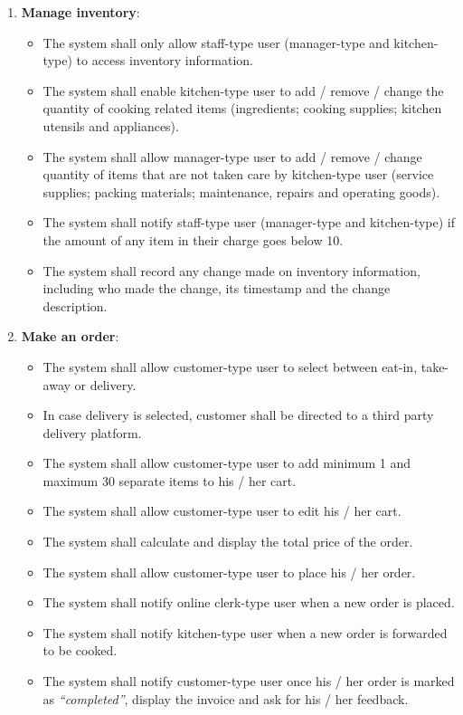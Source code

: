 \documentclass[12pt, a4paper]{article}
\theoremstyle{styleth}
\theoremstyle{styledef}
\begin{document}
\begin{enumerate}[label=\alph*., font=\itshape]
	\item \textbf{Manage inventory}:
	\begin{itemize}
		\item The system shall only allow staff-type user (manager-type and kitchen-type) to access inventory information.
		\item The system shall enable kitchen-type user to add / remove / change the quantity of cooking related items (ingredients; cooking supplies; kitchen utensils and appliances).
		\item The system shall allow manager-type user to add / remove / change quantity of items that are not taken care by kitchen-type user (service supplies; packing materials; maintenance, repairs and operating goods).
		\item The system shall notify staff-type user (manager-type and kitchen-type) if the amount of any item in their charge goes below 10.
		\item The system shall record any change made on inventory information, including who made the change, its timestamp and the change description.
	\end{itemize}
	
	\item \textbf{Make an order}:
	\begin{itemize}
		\item The system shall allow customer-type user to select between eat-in, take-away or delivery.
		\item In case delivery is selected, customer shall be directed to a third party delivery platform.
		\item The system shall allow customer-type user to add minimum 1 and maximum 30 separate items to his / her cart.
		\item The system shall allow customer-type user to edit his / her cart.
		\item The system shall calculate and display the total price of the order.
		\item The system shall allow customer-type user to place his / her order.
		\item The system shall notify online clerk-type user when a new order is placed.
		\item The system shall notify kitchen-type user when a new order is forwarded to be cooked.
		\item The system shall notify customer-type user once his / her order is marked as \textit{“completed”}, display the invoice and ask for his / her feedback.
	\end{itemize}


\end{enumerate}
\end{document}
